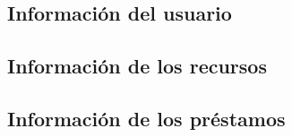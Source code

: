 
\subsection{Información del usuario}

\subsection{Información de los recursos}

\subsection{Información de los préstamos}
